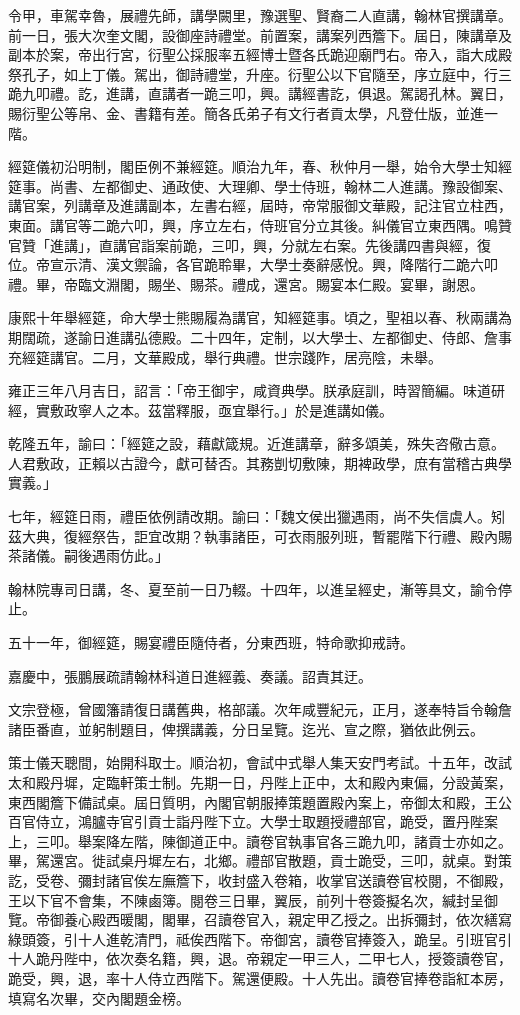 \begin{pinyinscope}
令甲，車駕幸魯，展禮先師，講學闕里，豫選聖、賢裔二人直講，翰林官撰講章。前一日，張大次奎文閣，設御座詩禮堂。前置案，講案列西簷下。屆日，陳講章及副本於案，帝出行宮，衍聖公採服率五經博士暨各氏跪迎廟門右。帝入，詣大成殿祭孔子，如上丁儀。駕出，御詩禮堂，升座。衍聖公以下官隨至，序立庭中，行三跪九叩禮。訖，進講，直講者一跪三叩，興。講經書訖，俱退。駕謁孔林。翼日，賜衍聖公等帛、金、書籍有差。簡各氏弟子有文行者貢太學，凡登仕版，並進一階。

經筵儀初沿明制，閣臣例不兼經筵。順治九年，春、秋仲月一舉，始令大學士知經筵事。尚書、左都御史、通政使、大理卿、學士侍班，翰林二人進講。豫設御案、講官案，列講章及進講副本，左書右經，屆時，帝常服御文華殿，記注官立柱西，東面。講官等二跪六叩，興，序立左右，侍班官分立其後。糾儀官立東西隅。鳴贊官贊「進講」，直講官詣案前跪，三叩，興，分就左右案。先後講四書與經，復位。帝宣示清、漢文禦論，各官跪聆畢，大學士奏辭感悅。興，降階行二跪六叩禮。畢，帝臨文淵閣，賜坐、賜茶。禮成，還宮。賜宴本仁殿。宴畢，謝恩。

康熙十年舉經筵，命大學士熊賜履為講官，知經筵事。頃之，聖祖以春、秋兩講為期闊疏，遂諭日進講弘德殿。二十四年，定制，以大學士、左都御史、侍郎、詹事充經筵講官。二月，文華殿成，舉行典禮。世宗踐阼，居亮陰，未舉。

雍正三年八月吉日，詔言：「帝王御宇，咸資典學。朕承庭訓，時習簡編。味道研經，實敷政寧人之本。茲當釋服，亟宜舉行。」於是進講如儀。

乾隆五年，諭曰：「經筵之設，藉獻箴規。近進講章，辭多頌美，殊失咨儆古意。人君敷政，正賴以古證今，獻可替否。其務剴切敷陳，期裨政學，庶有當稽古典學實義。」

七年，經筵日雨，禮臣依例請改期。諭曰：「魏文侯出獵遇雨，尚不失信虞人。矧茲大典，復經祭告，詎宜改期？執事諸臣，可衣雨服列班，暫罷階下行禮、殿內賜茶諸儀。嗣後遇雨仿此。」

翰林院專司日講，冬、夏至前一日乃輟。十四年，以進呈經史，漸等具文，諭令停止。

五十一年，御經筵，賜宴禮臣隨侍者，分東西班，特命歌抑戒詩。

嘉慶中，張鵬展疏請翰林科道日進經義、奏議。詔責其迂。

文宗登極，曾國籓請復日講舊典，格部議。次年咸豐紀元，正月，遂奉特旨令翰詹諸臣番直，並躬制題目，俾撰講義，分日呈覽。迄光、宣之際，猶依此例云。

策士儀天聰間，始開科取士。順治初，會試中式舉人集天安門考試。十五年，改試太和殿丹墀，定臨軒策士制。先期一日，丹陛上正中，太和殿內東偏，分設黃案，東西閣簷下備試桌。屆日質明，內閣官朝服捧策題置殿內案上，帝御太和殿，王公百官侍立，鴻臚寺官引貢士詣丹陛下立。大學士取題授禮部官，跪受，置丹陛案上，三叩。舉案降左階，陳御道正中。讀卷官執事官各三跪九叩，諸貢士亦如之。畢，駕還宮。徙試桌丹墀左右，北鄉。禮部官散題，貢士跪受，三叩，就桌。對策訖，受卷、彌封諸官俟左廡簷下，收封盛入卷箱，收掌官送讀卷官校閱，不御殿，王以下官不會集，不陳鹵簿。閱卷三日畢，翼辰，前列十卷簽擬名次，緘封呈御覽。帝御養心殿西暖閣，閣畢，召讀卷官入，親定甲乙授之。出拆彌封，依次繕寫綠頭簽，引十人進乾清門，祗俟西階下。帝御宮，讀卷官捧簽入，跪呈。引班官引十人跪丹陛中，依次奏名籍，興，退。帝親定一甲三人，二甲七人，授簽讀卷官，跪受，興，退，率十人侍立西階下。駕還便殿。十人先出。讀卷官捧卷詣紅本房，填寫名次畢，交內閣題金榜。


\end{pinyinscope}
